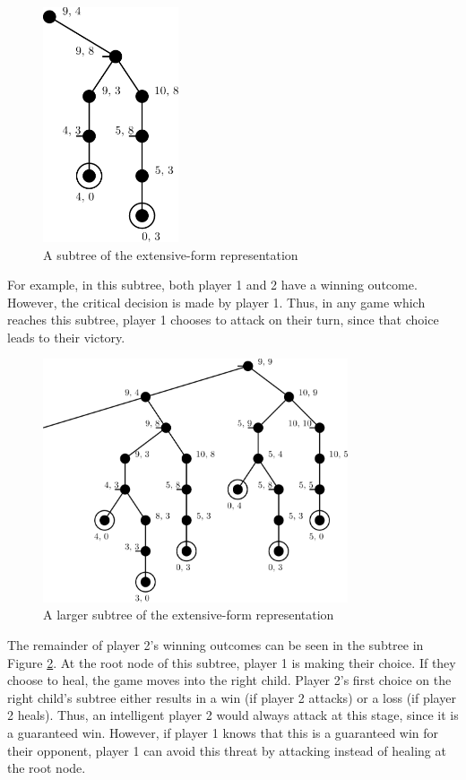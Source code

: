 \begin{figure}[H]
  \centering
  \includegraphics[width=4cm]{figures/GameSubtree.png}
  \caption{A subtree of the extensive-form representation}
  \label{fig:gameSubtree}
\end{figure}

For example, in this subtree, both player 1 and 2 have a winning outcome. However, the critical decision is made by player 1. Thus, in any game which reaches this subtree, player 1 chooses to attack on their turn, since that choice leads to their victory.\\

\begin{figure}[H]
  \centering
  \includegraphics[width=9cm]{figures/GameSubtree2.png}
  \caption{A larger subtree of the extensive-form representation}
  \label{fig:gameSubtree2}
\end{figure}

The remainder of player 2's winning outcomes can be seen in the subtree in Figure \ref{fig:gameSubtree2}. At the root node of this subtree, player 1 is making their choice. If they choose to heal, the game moves into the right child. Player 2's first choice on the right child's subtree either results in a win (if player 2 attacks) or a loss (if player 2 heals). Thus, an intelligent player 2 would always attack at this stage, since it is a guaranteed win. However, if player 1 knows that this is a guaranteed win for their opponent, player 1 can avoid this threat by attacking instead of healing at the root node.\\

